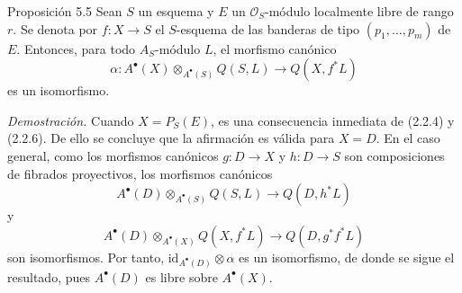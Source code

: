 \begin{statement}{Proposición 5.5}
Sean $S$ un esquema y $E$ un $\mathcal O_S$-módulo localmente libre de rango $r$. Se denota por $f:X\to S$ el $S$-esquema de las banderas de tipo $(p_1,\ldots,p_m)$ de $E$. Entonces, para todo $A_S$-módulo $L$, el morfismo canónico
\[
\alpha:A^\bullet(X)\otimes_{A^\bullet(S)}Q(S,L)\to Q(X,f^*L)
\]
es un isomorfismo.
\end{statement}

\emph{Demostración.} Cuando $X=P_S(E)$, es una consecuencia inmediata de (2.2.4) y (2.2.6). De ello se concluye que la afirmación es válida para $X=D$. En el caso general, como los morfismos canónicos $g:D\to X$ y $h:D\to S$ son composiciones de fibrados proyectivos, los morfismos canónicos
\[
A^\bullet(D)\otimes_{A^\bullet(S)}Q(S,L)\to Q(D,h^*L)
\]
y
\[
A^\bullet(D)\otimes_{A^\bullet(X)}Q(X,f^*L)\to Q(D,g^*f^*L)
\]
son isomorfismos. Por tanto, $\mathrm{id}_{A^\bullet(D)}\otimes\alpha$ es un isomorfismo, de donde se sigue el resultado, pues $A^\bullet(D)$ es libre sobre $A^\bullet(X)$.

